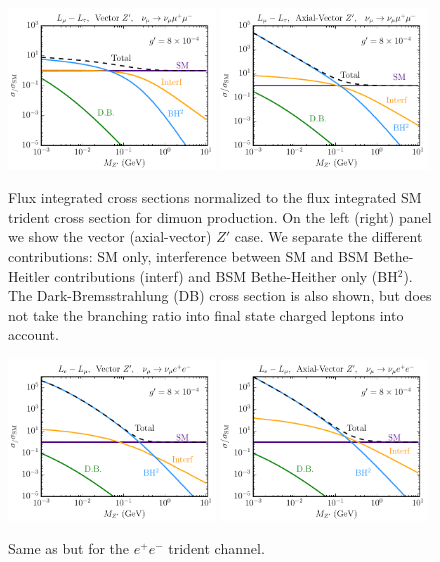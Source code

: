 %
\begin{figure}[t]
%
\includegraphics[width=0.49\textwidth]{SMvsBSMmass_xsec_mmmm_vec.pdf}
\includegraphics[width=0.49\textwidth]{SMvsBSMmass_xsec_mmmm_ax.pdf}
\caption[BSM enhancement to dimuon neutrino trident production total cross section.]{\label{fig:xsecs_mmmm} Flux integrated cross sections normalized to the flux integrated SM trident cross section for dimuon production. On the left (right) panel we show the vector (axial-vector) $Z'$ 
case. We separate the different contributions:
 SM only, interference between SM and BSM Bethe-Heitler contributions (interf) and BSM Bethe-Heither only (BH$^2$). The Dark-Bremsstrahlung (DB) cross section is also shown, but does not take the branching ratio into final state charged leptons into account.}
%
\end{figure}
%
\begin{figure}[t]
%
\includegraphics[width=0.49\textwidth]{SMvsBSMmass_xsec_mmee_vec.pdf}
\includegraphics[width=0.49\textwidth]{SMvsBSMmass_xsec_mmee_ax.pdf}
%
\caption[BSM enhancement to dielectron neutrino trident production total cross section.]{\label{fig:xsecs_mmee} Same as  but for the $e^+e^-$ trident channel.}
%
\end{figure}

